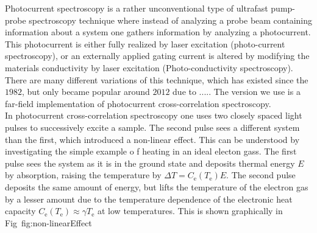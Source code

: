 Photocurrent spectroscopy is a rather unconventional type of ultrafast pump-probe spectroscopy technique where instead of analyzing a probe beam containing information about a system one gathers information by analyzing a photocurrent. This photocurrent is either fully realized by laser excitation (photo-current spectroscopy), or an externally applied gating current is altered by modifying the materials conductivity by laser excitation (Photo-conductivity spectroscopy). There are many different variations of this technique, which has existed since the $1982$, but only became popular around $2012$ due to ..... The version we use is a far-field implementation of photocurrent cross-correlation spectroscopy.\\
\newline
In photocurrent cross-correlation spectroscopy one uses two closely spaced light pulses to successively excite a sample. The second pulse sees a different system than the first, which introduced a non-linear effect. This can be understood by investigating the simple example o f heating in an ideal electon gass. The first pulse sees the system as it is in the ground state and deposits thermal energy $E$ by absorption, raising the temperature by $\Delta T = C_{\text{e}}(T_{\text{e}})E$. The second pulse deposits the same amount of energy, but lifts the temperature of the electron gas by a lesser amount due to the temperature dependence of the electronic heat capacity $C_{\text{e}}(T_{\text{e}})\approx\gamma T_{\text{e}}$ at low temperatures. This is shown graphically in Fig~{fig:non-linearEffect}
\begin{figure}[!h]
  \centering
  \caption{}
  \label{fig:non-linearEffect}
\end{figure}

